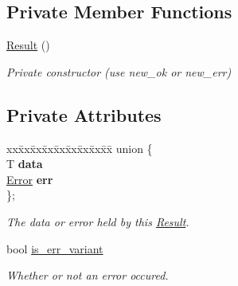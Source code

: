 \subsection*{Private Member Functions}
\begin{DoxyCompactItemize}
\item 
\mbox{\label{classnta_1_1Result_a6bb10dacafbf334b7209adc5615de44e}} 
\hyperlink{classnta_1_1Result_a6bb10dacafbf334b7209adc5615de44e}{Result} ()
\begin{DoxyCompactList}\small\item\em Private constructor (use new\+\_\+ok or new\+\_\+err) \end{DoxyCompactList}\end{DoxyCompactItemize}
\subsection*{Private Attributes}
\begin{DoxyCompactItemize}
\item 
\mbox{\label{classnta_1_1Result_a225adf68d093d584826f4aab98cacf97}} 
\begin{tabbing}
xx\=xx\=xx\=xx\=xx\=xx\=xx\=xx\=xx\=\kill
union \{\\
\mbox{\label{classnta_1_1Result_ab084104dfedebe7715d97987595ad147}} 
T {\bfseries data}\\
\mbox{\label{classnta_1_1Result_acd60a522df7b4adf81729de1dc626955}} 
\hyperlink{structnta_1_1Error}{Error} {\bfseries err}\\
\}; \\

\end{tabbing}\begin{DoxyCompactList}\small\item\em The data or error held by this \hyperlink{classnta_1_1Result}{Result}. \end{DoxyCompactList}\item 
\mbox{\label{classnta_1_1Result_a27f85dc35976426c1f5c01431ac2e1cc}} 
bool \hyperlink{classnta_1_1Result_a27f85dc35976426c1f5c01431ac2e1cc}{is\+\_\+err\+\_\+variant}
\begin{DoxyCompactList}\small\item\em Whether or not an error occured. \end{DoxyCompactList}\end{DoxyCompactItemize}


